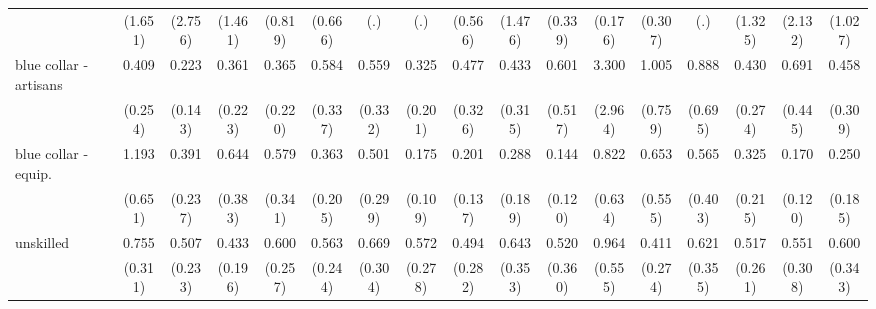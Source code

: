 {\begin{tabular}{l*{16}{c}}
                    &     (1.651)         &     (2.756)         &     (1.461)         &     (0.819)         &     (0.666)         &         (.)         &         (.)         &     (0.566)         &     (1.476)         &     (0.339)         &     (0.176)         &     (0.307)         &         (.)         &     (1.325)         &     (2.132)         &     (1.027)         \\
[1em]
blue collar - artisans&       0.409         &       0.223\sym{*}  &       0.361         &       0.365         &       0.584         &       0.559         &       0.325         &       0.477         &       0.433         &       0.601         &       3.300         &       1.005         &       0.888         &       0.430         &       0.691         &       0.458         \\
                    &     (0.254)         &     (0.143)         &     (0.223)         &     (0.220)         &     (0.337)         &     (0.332)         &     (0.201)         &     (0.326)         &     (0.315)         &     (0.517)         &     (2.964)         &     (0.759)         &     (0.695)         &     (0.274)         &     (0.445)         &     (0.309)         \\
[1em]
blue collar - equip.&       1.193         &       0.391         &       0.644         &       0.579         &       0.363         &       0.501         &       0.175\sym{**} &       0.201\sym{*}  &       0.288         &       0.144\sym{*}  &       0.822         &       0.653         &       0.565         &       0.325         &       0.170\sym{*}  &       0.250         \\
                    &     (0.651)         &     (0.237)         &     (0.383)         &     (0.341)         &     (0.205)         &     (0.299)         &     (0.109)         &     (0.137)         &     (0.189)         &     (0.120)         &     (0.634)         &     (0.555)         &     (0.403)         &     (0.215)         &     (0.120)         &     (0.185)         \\
[1em]
unskilled           &       0.755         &       0.507         &       0.433         &       0.600         &       0.563         &       0.669         &       0.572         &       0.494         &       0.643         &       0.520         &       0.964         &       0.411         &       0.621         &       0.517         &       0.551         &       0.600         \\
                    &     (0.311)         &     (0.233)         &     (0.196)         &     (0.257)         &     (0.244)         &     (0.304)         &     (0.278)         &     (0.282)         &     (0.353)         &     (0.360)         &     (0.555)         &     (0.274)         &     (0.355)         &     (0.261)         &     (0.308)         &     (0.343)         \\

\end{tabular}}
